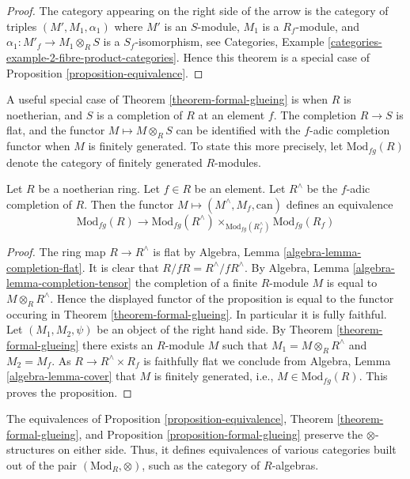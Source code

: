 \begin{proof}
The category appearing on the right side of the arrow
is the category of triples $(M', M_1, \alpha_1)$ where $M'$ is an
$S$-module, $M_1$ is a $R_f$-module, and
$\alpha_1 : M'_f \to M_1 \otimes_R S$ is a $S_f$-isomorphism, see
Categories, Example \ref{categories-example-2-fibre-product-categories}.
Hence this theorem is a special case of
Proposition \ref{proposition-equivalence}.
\end{proof}

\noindent
A useful special case of
Theorem \ref{theorem-formal-glueing}
is when $R$ is noetherian, and $S$ is a completion of $R$ at an
element $f$. The completion $R \to S$ is flat, and the functor
$M \mapsto M \otimes_R S$ can be identified with the $f$-adic
completion functor when $M$ is finitely generated. To state
this more precisely, let $\text{Mod}_{fg}(R)$ denote the category
of finitely generated $R$-modules.

\begin{proposition}
\label{proposition-formal-glueing}
Let $R$ be a noetherian ring.
Let $f \in R$ be an element.
Let $R^\wedge$ be the $f$-adic completion of $R$.
Then the functor $M \mapsto (M^\wedge, M_f, \text{can})$
defines an equivalence
$$
\text{Mod}_{fg}(R)
\longrightarrow
\text{Mod}_{fg}(R^\wedge)
\times_{\text{Mod}_{fg}(R^\wedge_f)}
\text{Mod}_{fg}(R_f)
$$
\end{proposition}

\begin{proof}
The ring map $R \to R^\wedge$ is flat by
Algebra, Lemma \ref{algebra-lemma-completion-flat}.
It is clear that $R/fR = R^\wedge/fR^\wedge$.
By
Algebra, Lemma \ref{algebra-lemma-completion-tensor}
the completion of a finite $R$-module $M$ is equal to $M \otimes_R R^\wedge$.
Hence the displayed functor of the proposition is equal to the
functor occuring in
Theorem \ref{theorem-formal-glueing}.
In particular it is fully faithful. Let $(M_1, M_2, \psi)$ be an
object of the right hand side. By
Theorem \ref{theorem-formal-glueing}
there exists an $R$-module $M$ such that
$M_1 = M \otimes_R R^\wedge$ and $M_2 = M_f$. As $R \to R^\wedge \times R_f$
is faithfully flat we conclude from
Algebra, Lemma \ref{algebra-lemma-cover}
that $M$ is finitely generated, i.e., $M \in \text{Mod}_{fg}(R)$.
This proves the proposition.
\end{proof}

\begin{remark}
\label{remark-formal-glueing-algebras}
The equivalences of
Proposition \ref{proposition-equivalence},
Theorem \ref{theorem-formal-glueing}, and
Proposition \ref{proposition-formal-glueing}
preserve the $\otimes$-structures on either side.
Thus, it defines equivalences of various categories
built out of the pair $(\text{Mod}_R, \otimes)$, such as the category of
$R$-algebras.
\end{remark}

